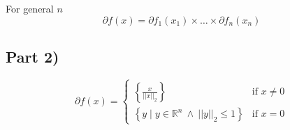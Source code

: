 \documentclass[10pt,a4paper]{article}
\begin{document}
For general $n$
\begin{equation*}
  \partial f(x) = \partial f_{1}(x_{1}) \times \dots \times \partial f_{n}(x_{n})
\end{equation*}

\subsection*{Part 2)}

\begin{equation*}
  \partial f(x) = \begin{cases}
    \left\{ \frac{x}{||x||_{2}} \right\} & \text{if $x \ne 0$}\\
    \left\{ y \mid y \in \mathbb{R}^{n}~\land~||y||_{2} \le 1 \right\} & \text{if $x = 0$}
  \end{cases}
\end{equation*}
\end{document}
